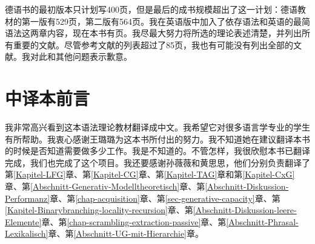德语书的最初版本只计划写400页，但是最后的成书规模超出了这一计划：德语教材的第一版有529页，第二版有564页。我在英语版中加入了依存语法和英语的最简语法这两章内容，现在本书有\pageref{LastPage}页。我尽最大努力将所选的理论表述清楚，并列出所有重要的文献。尽管参考文献的列表超过了85页，我也有可能没有列出全部的文献。我对此和其他问题表示歉意。







\section*{中译本前言}

我非常高兴看到这本语法理论教材翻译成中文。我希望它对很多语言学专业的学生有所帮助。我衷心感谢王璐璐为这本书所付出的努力。我不知道她在建议翻译本书的时候是否知道需要做多少工作。我是不知道的。不管怎样，我很欣慰本书已翻译完成，我们也完成了这个项目。我还要感谢孙薇薇和黄思思，他们分别负责翻译了第\ref{Kapitel-LFG}章、第\ref{Kapitel-CG}章、第\ref{Kapitel-TAG}章和第\ref{Kapitel-CxG}章、第\ref{Abschnitt-Generativ-Modelltheoretisch}章、第\ref{Abschnitt-Diskussion-Performanz}章、第\ref{chap-acquisition}章、第\ref{sec-generative-capacity}章、第\ref{Kapitel-Binarybranching-locality-recursion}章、第\ref{Abschnitt-Diskussion-leere-Elemente}章、第\ref{chap-scrambling-extraction-passive}章、第\ref{Abschnitt-Phrasal-Lexikalisch}章、第\ref{Abschnitt-UG-mit-Hierarchie}章。

